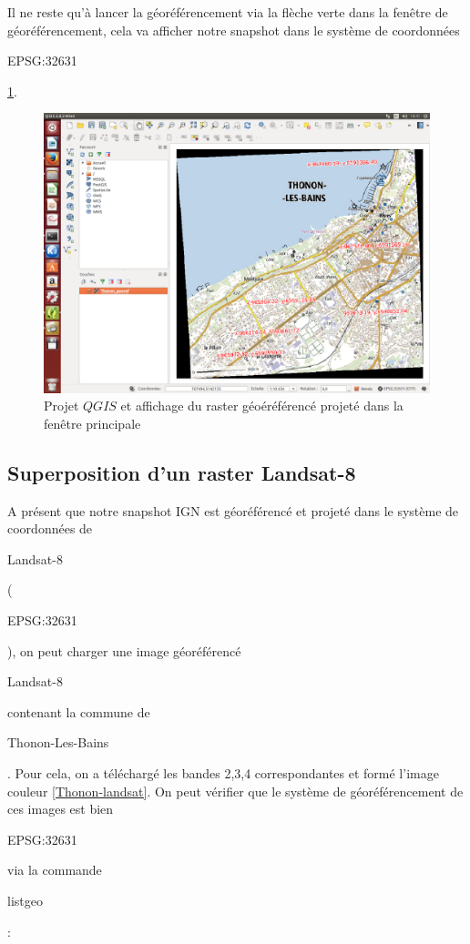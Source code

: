 \documentclass{book}
\begin{document}
\clearpage

Il ne reste qu'à lancer la géoréférencement via la flèche verte dans la fen\^{e}tre de géoréférencement, cela va afficher
notre snapshot dans le système de coordonnées \begin{itshape}EPSG:32631\end{itshape} \ref{qgis-resultat}.

\begin{figure}[H]
\begin{center}
\includegraphics[scale=0.3]{images/georeferencing/qgis-resultat.png}
\end{center}
\caption{Projet $QGIS$ et affichage du raster géoéréférencé projeté dans la fen\^{e}tre principale}
\label{qgis-resultat}
\end{figure}

\clearpage

\subsection{Superposition d'un raster Landsat-8}

A présent que notre snapshot IGN est géoréférencé et projeté dans le système de coordonnées de \begin{itshape}Landsat-8\end{itshape}
(\begin{itshape}EPSG:32631\end{itshape}), on peut charger une image géoréférencé \begin{itshape}Landsat-8\end{itshape} contenant la 
commune de \begin{itshape}Thonon-Les-Bains\end{itshape}. Pour cela, on a téléchargé les bandes 2,3,4 correspondantes et formé l'image 
couleur  \ref{Thonon-landsat}. On peut vérifier que le système de géoréférencement de ces images est bien \begin{itshape}EPSG:32631\end{itshape} via la 
commande \begin{itshape}listgeo\end{itshape}:\\
\end{document}
